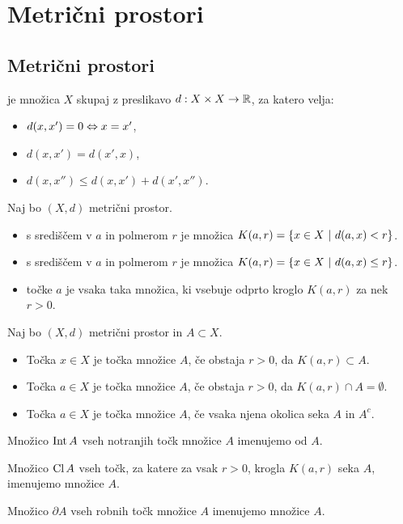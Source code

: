 \section*{Metrični prostori}
\subsection*{Metrični prostori}
\begin{definicija}
     je množica $X$ skupaj z preslikavo $d: X \times X \to \mathbb{R}$, za katero velja:
    \begin{itemize}
        \item $d(x, x') = 0 \Leftrightarrow x=x'$,
        \item $d(x, x') = d(x', x)$,
        \item $d(x, x'') \leq d(x, x') + d(x', x'')$.
    \end{itemize}
\end{definicija}

\begin{definicija}
    Naj bo $(X, d)$ metrični prostor. 
    \begin{itemize}
        \item {} s središčem v $a$ in polmerom $r$ je množica $K(a, r) = \left\{x \in X \ | \ d(a,x) < r\right\}$.
        \item {} s središčem v $a$ in polmerom $r$ je množica $K(a, r) = \left\{x \in X \ | \ d(a,x) \leq r\right\}$. 
        \item {} točke $a$ je vsaka taka množica, ki vsebuje odprto kroglo $K(a, r)$ za nek $r>0$.
    \end{itemize}    
\end{definicija}

\begin{definicija}
    Naj bo $(X, d)$ metrični prostor in $A \subset X$.
    \begin{itemize}
        \item Točka $x \in X$ je  točka množice $A$, če obstaja $r>0$, da $K(a,r) \subset A$.
        \item Točka $a \in X$ je  točka množice $A$, če obstaja $r>0$, da $K(a,r) \cap A = \emptyset$.
        \item Točka $a \in X$ je  točka množice $A$, če vsaka njena okolica seka $A$ in $A^c$.
    \end{itemize}
    Množico $\operatorname{Int} A$ vseh notranjih točk množice $A$ imenujemo  od $A$. 

    Množico $\operatorname{Cl} A$ vseh točk, za katere za vsak $r>0$, krogla $K(a, r)$ seka $A$, imenujemo  množice $A$.
    
    Množico $\partial A$ vseh robnih točk množice $A$ imenujemo  množice $A$.     
\end{definicija}


